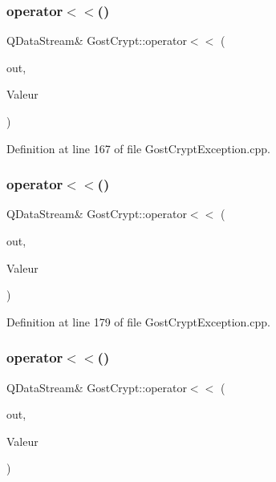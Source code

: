 \subsubsection{\texorpdfstring{operator$<$$<$()}{operator<<()}\hspace{0.1cm}{\footnotesize\ttfamily [10/13]}}
{\footnotesize\ttfamily Q\+Data\+Stream\& Gost\+Crypt\+::operator$<$$<$ (\begin{DoxyParamCaption}\item[{Q\+Data\+Stream \&}]{out,  }\item[{const \hyperlink{class_gost_crypt_1_1_failed_memory_allocation}{Gost\+Crypt\+::\+Failed\+Memory\+Allocation} \&}]{Valeur }\end{DoxyParamCaption})}



Definition at line 167 of file Gost\+Crypt\+Exception.\+cpp.

\mbox{\label{namespace_gost_crypt_af125544afc2a9e2975524962f21c13d3}} 
\subsubsection{\texorpdfstring{operator$<$$<$()}{operator<<()}\hspace{0.1cm}{\footnotesize\ttfamily [11/13]}}
{\footnotesize\ttfamily Q\+Data\+Stream\& Gost\+Crypt\+::operator$<$$<$ (\begin{DoxyParamCaption}\item[{Q\+Data\+Stream \&}]{out,  }\item[{const \hyperlink{class_gost_crypt_1_1_unknow_exception}{Gost\+Crypt\+::\+Unknow\+Exception} \&}]{Valeur }\end{DoxyParamCaption})}



Definition at line 179 of file Gost\+Crypt\+Exception.\+cpp.

\mbox{\label{namespace_gost_crypt_a0c3976f48a6db48a2bb3173b0482eea7}} 
\subsubsection{\texorpdfstring{operator$<$$<$()}{operator<<()}\hspace{0.1cm}{\footnotesize\ttfamily [12/13]}}
{\footnotesize\ttfamily Q\+Data\+Stream\& Gost\+Crypt\+::operator$<$$<$ (\begin{DoxyParamCaption}\item[{Q\+Data\+Stream \&}]{out,  }\item[{const \hyperlink{class_gost_crypt_1_1_external_exception}{Gost\+Crypt\+::\+External\+Exception} \&}]{Valeur }\end{DoxyParamCaption})}



